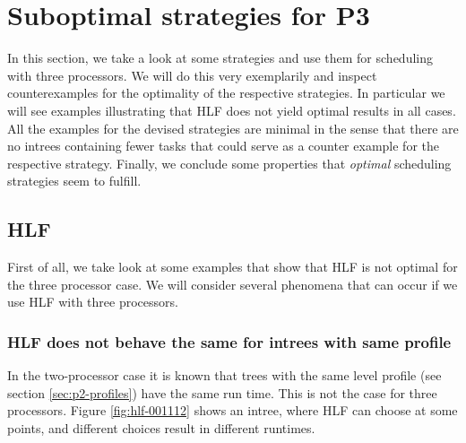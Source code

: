 \chapter{Suboptimal strategies for P3}
\label{chap:p3-suboptimal}

In this section, we take a look at some strategies and use them for scheduling with three processors. We will do this very exemplarily and inspect counterexamples for the optimality of the respective strategies. In particular we will see examples illustrating that HLF does not yield optimal results in all cases. All the examples for the devised strategies are minimal in the sense that there are no intrees containing fewer tasks that could serve as a counter example for the respective strategy.
Finally, we conclude some properties that \emph{optimal} scheduling strategies seem to fulfill.

\section{HLF}
\label{sec:hlf-p3-suboptimal}

First of all, we take look at some examples that show that HLF is not optimal for the three processor case. We will consider several phenomena that can occur if we use HLF with three processors.

\subsection{HLF does not behave the same for intrees with same profile}
\label{sec:p3-suboptimal-hlf-same-profiles-different-run-times}

In the two-processor case it is known that trees with the same level profile (see section \ref{sec:p2-profiles}) have the same run time. This is not the case for three processors. Figure \ref{fig:hlf-001112} shows an intree, where HLF can choose at some points, and different choices result in different runtimes.

